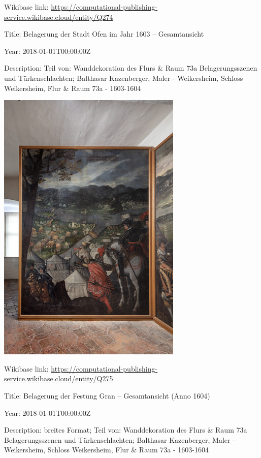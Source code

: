 \documentclass[
  letterpaper,
]{book}
\begin{document}
Wikibase link:
\url{https://computational-publishing-service.wikibase.cloud/entity/Q274}

Title: Belagerung der Stadt Ofen im Jahr 1603 -- Gesamtansicht

Year: 2018-01-01T00:00:00Z

Description: Teil von: Wanddekoration des Flurs \& Raum 73a
Belagerungsszenen und Türkenschlachten; Balthasar Kazenberger, Maler -
Weikersheim, Schloss Weikersheim, Flur \& Raum 73a - 1603-1604

\includegraphics{paintings_files/figure-pdf/cell-3-output-98.png}

Wikibase link:
\url{https://computational-publishing-service.wikibase.cloud/entity/Q275}

Title: Belagerung der Festung Gran -- Gesamtansicht (Anno 1604)

Year: 2018-01-01T00:00:00Z

Description: breites Format; Teil von: Wanddekoration des Flurs \& Raum
73a Belagerungsszenen und Türkenschlachten; Balthasar Kazenberger, Maler
- Weikersheim, Schloss Weikersheim, Flur \& Raum 73a - 1603-1604
\end{document}
